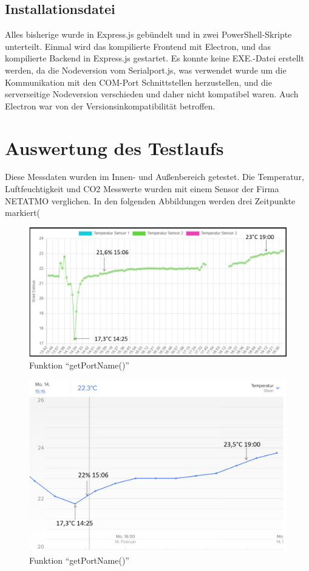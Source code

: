 \documentclass[]{article}
\begin{document}
			\subsection{Installationsdatei}
			Alles bisherige wurde in Express.js gebündelt und in zwei PowerShell-Skripte unterteilt. Einmal wird das kompilierte Frontend mit Electron, und das kompilierte Backend in Express.js gestartet.
			Es konnte keine EXE.-Datei erstellt werden, da die Nodeversion vom Serialport.js, was verwendet wurde um die Kommunikation mit den COM-Port Schnittstellen herzustellen, und die serverseitige Nodeversion verschieden und daher nicht kompatibel waren. Auch Electron war von der Versionsinkompatibilität betroffen. 
			
	\section{Auswertung des Testlaufs}
			Diese Messdaten wurden im Innen- und Außenbereich getestet. Die Temperatur, Luftfeuchtigkeit und CO2 Messwerte wurden mit einem Sensor der Firma NETATMO verglichen. In den folgenden Abbildungen werden drei Zeitpunkte markiert(%
			\begin{figure}[!h]
				\centering
				\includegraphics[scale=0.18]{images/temp_proj}
				\caption{Funktion “getPortName()”}
				\label{img:temp_proj}
			\end{figure}
			\begin{figure}[!h]
				\centering
				\includegraphics[scale=0.18]{images/temp_NETATMO}
				\caption{Funktion “getPortName()”}
				\label{img:temp_NETATMO}
			\end{figure}
\end{document}
